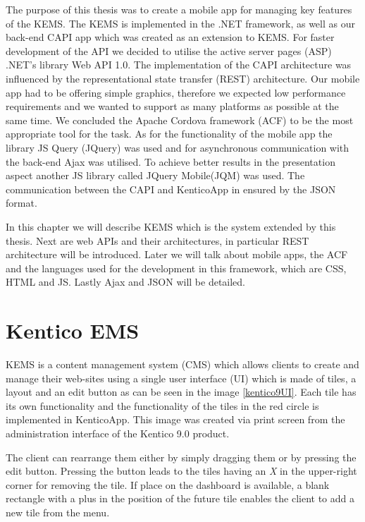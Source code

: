 The purpose of this thesis was to create a mobile app for managing key features of the KEMS. The KEMS is implemented in the .NET framework, as well as our back-end CAPI app which was created as an extension to KEMS. For faster development of the API we decided to utilise the active server pages (ASP) .NET's library Web API 1.0. The implementation of the CAPI architecture was influenced by the representational state transfer (REST) architecture. Our mobile app had to be offering simple graphics, therefore we expected low performance requirements and we wanted to support as many platforms as possible at the same time. We concluded the Apache Cordova framework (ACF) to be the most appropriate tool for the task. As for the functionality of the mobile app the library JS Query (JQuery) was used and for asynchronous communication with the back-end Ajax was utilised. To achieve better results in the presentation aspect another JS library called JQuery Mobile(JQM) was used. The communication between the CAPI and KenticoApp in ensured by the JSON format.

In this chapter we will describe KEMS which is the system extended by this thesis. Next are web APIs and their architectures, in particular REST architecture will be introduced. Later we will talk about mobile apps, the ACF and the languages used for the development in this framework, which are CSS, HTML and JS. Lastly Ajax and JSON will be detailed. 
\section{Kentico EMS} \label{analysisKenticoCMS}
KEMS \cite{kentico-product-overview} is a content management system (CMS) which allows clients to create and manage their web-sites using a single user interface (UI) which is made of tiles, a layout and an edit button as can be seen in the image \ref{kentico9UI}. Each tile has its own functionality and the functionality of the tiles in the red circle is implemented in KenticoApp. This image was created via print screen from the administration interface of the Kentico 9.0 product.

The client can rearrange them either by simply dragging them or by pressing the edit button. Pressing the button leads to the tiles having an \textit{X} in the upper-right corner for removing the tile. If place on the dashboard is available, a blank rectangle with a plus in the position of the future tile enables the client to add a new tile from the menu. 

